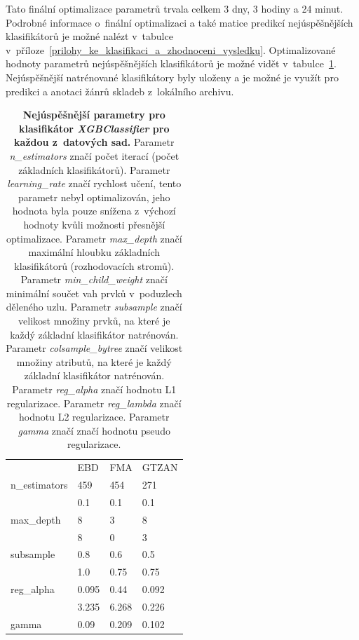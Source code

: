 Tato finální optimalizace parametrů trvala celkem 3 dny, 3 hodiny a 24 minut. Podrobné informace o~finální optimalizaci a také matice predikcí nejúspěšnějších klasifikátorů je možné nalézt v~tabulce v~příloze~\ref{prilohy_ke_klasifikaci_a_zhodnoceni_vysledku}. Optimalizované hodnoty parametrů nejúspěšnějších klasifikátorů je možné vidět v~tabulce~\ref{best_parameters}. Nejúspěšnější natrénované klasifikátory byly uloženy a je možné je využít pro predikci a anotaci žánrů skladeb z~lokálního archivu.

\begin{table}[H]
	\vskip6pt
    \caption{\textbf{Nejúspěšnější parametry pro klasifikátor \textit{XGBClassifier} pro každou z~datových sad.} Parametr \textit{n\_estimators} značí počet iterací (počet základních klasifikátorů). Parametr \textit{learning\_rate} značí rychlost učení, tento parametr nebyl optimalizován, jeho hodnota byla pouze snížena z~výchozí hodnoty kvůli možnosti přesnější optimalizace. Parametr \textit{max\_depth} značí maximální hloubku základních klasifikátorů (rozhodovacích stromů). Parametr \textit{min\_child\_weight} značí minimální součet vah prvků v~poduzlech děleného uzlu. Parametr \textit{subsample} značí velikost množiny prvků, na které je každý základní klasifikátor natrénován. Parametr \textit{colsample\_bytree} značí velikost množiny atributů, na které je každý základní klasifikátor natrénován. Parametr \textit{reg\_alpha} značí hodnotu  L1 regularizace.  Parametr \textit{reg\_lambda} značí hodnotu  L2 regularizace. Parametr \textit{gamma} značí značí hodnotu  pseudo regularizace.}
    \label{best_parameters}  
    \vskip6pt
	\centering
    \begin{tabular}{llll}
                                                                    & EBD   & FMA   & GTZAN \\ \cline{2-4} 
    \multicolumn{1}{l|}{n\_estimators}                              & 459   & 454   & 271   \\
    \rowcolor[HTML]{EFEFEF} 
    \multicolumn{1}{l|}{\cellcolor[HTML]{EFEFEF}learning\_rate}     & 0.1   & 0.1   & 0.1   \\
    \multicolumn{1}{l|}{max\_depth}                                 & 8     & 3     & 8     \\
    \rowcolor[HTML]{EFEFEF} 
    \multicolumn{1}{l|}{\cellcolor[HTML]{EFEFEF}min\_child\_weight} & 8     & 0     & 3     \\
    \multicolumn{1}{l|}{subsample}                                  & 0.8   & 0.6   & 0.5   \\
    \rowcolor[HTML]{EFEFEF} 
    \multicolumn{1}{l|}{\cellcolor[HTML]{EFEFEF}colsample\_bytree}  & 1.0   & 0.75  & 0.75  \\
    \multicolumn{1}{l|}{reg\_alpha}                                 & 0.095 & 0.44  & 0.092 \\
    \rowcolor[HTML]{EFEFEF} 
    \multicolumn{1}{l|}{\cellcolor[HTML]{EFEFEF}reg\_lambda}        & 3.235 & 6.268 & 0.226 \\
    \multicolumn{1}{l|}{gamma}                                      & 0.09  & 0.209 & 0.102
    \end{tabular}
    \end{table}

